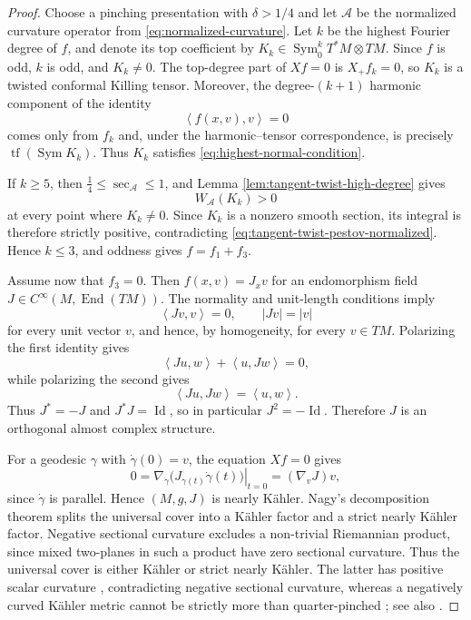\documentclass[reqno,11pt]{amsart}
\theoremstyle{definition}
\newcommand{\cA}{\mathcal A}
\newcommand{\Sym}{\operatorname{Sym}}
\newcommand{\End}{\operatorname{End}}
\newcommand{\Id}{\operatorname{Id}}
\newcommand{\tf}{\operatorname{tf}}
\newcommand{\inner}[2]{\left\langle #1,#2\right\rangle}
\begin{document}
\begin{proof}
Choose a pinching presentation with $\delta>1/4$ and let $\cA$ be the
normalized curvature operator from \eqref{eq:normalized-curvature}. Let $k$
be the highest Fourier degree of $f$, and denote its top coefficient by
$K_k\in\Sym^k_0T^*M\otimes TM$. Since $f$ is odd, $k$ is odd, and
$K_k\neq0$. The top-degree part of $Xf=0$ is $X_+f_k=0$, so $K_k$ is a
twisted conformal Killing tensor. Moreover, the degree-$(k+1)$ harmonic
component of the identity
$$
  \inner{f(x,v)}{v}=0
$$
comes only from $f_k$ and, under the harmonic--tensor correspondence, is
precisely $\tf(\Sym K_k)$. Thus $K_k$ satisfies
\eqref{eq:highest-normal-condition}.

If $k\geq5$, then $\frac14\leq\sec_{\cA}\leq1$, and
Lemma \ref{lem:tangent-twist-high-degree} gives
$$
  W_{\cA}(K_k)>0
$$
at every point where $K_k\neq0$. Since $K_k$ is a nonzero smooth section,
its integral is therefore strictly positive, contradicting
\eqref{eq:tangent-twist-pestov-normalized}. Hence $k\leq3$, and oddness gives
$f=f_1+f_3$.

Assume now that $f_3=0$. Then $f(x,v)=J_xv$ for an endomorphism field
$J\in C^\infty(M,\End(TM))$. The normality and unit-length conditions imply
$$
  \inner{Jv}{v}=0,
  \qquad
  |Jv|=|v|
$$
for every unit vector $v$, and hence, by homogeneity, for every $v\in TM$.
Polarizing the first identity gives
$$
  \inner{Ju}{w}+\inner{u}{Jw}=0,
$$
while polarizing the second gives
$$
  \inner{Ju}{Jw}=\inner{u}{w}.
$$
Thus $J^*=-J$ and $J^*J=\Id$, so in particular $J^2=-\Id$. Therefore $J$
is an orthogonal almost complex structure.

For a geodesic $\gamma$ with $\dot\gamma(0)=v$, the equation $Xf=0$ gives
$$
  0=\left.\nabla_{\dot\gamma}
     \bigl(J_{\gamma(t)}\dot\gamma(t)\bigr)\right|_{t=0}
   =(\nabla_vJ)v,
$$
since $\dot\gamma$ is parallel. Hence $(M,g,J)$ is nearly K\"ahler.
Nagy's decomposition theorem \cite{Nagy02} splits the universal cover into
a K\"ahler factor and a strict nearly K\"ahler factor. Negative sectional
curvature excludes a non-trivial Riemannian product, since mixed two-planes
in such a product have zero sectional curvature. Thus the universal cover
is either K\"ahler or strict nearly K\"ahler. The latter has positive scalar
curvature \cite{Gray76,Nagy02}, contradicting negative sectional curvature,
whereas a negatively curved K\"ahler metric cannot be strictly more than
quarter-pinched \cite{Berger60}; see also
\cite[proof of Theorem~4.1]{CLMS24}.
\end{proof}
\end{document}
